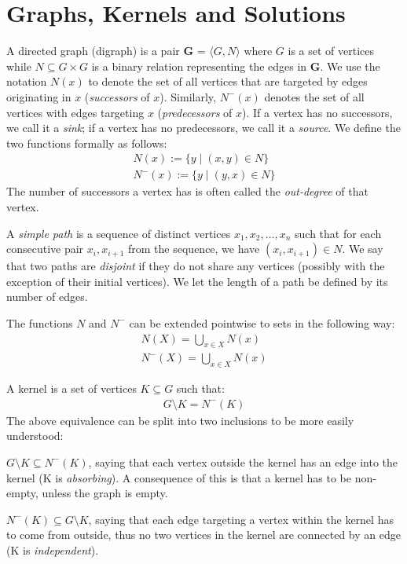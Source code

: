 \section{Graphs, Kernels and Solutions}
\label{sec:Graphs, Kernels and Solutions}
A directed graph (digraph) is a pair \textbf{G} = $\langle G,N \rangle$ where $G$ is a set of vertices while $N \subseteq G \times G$ is a binary relation representing the edges in \textbf{G}.
We use the notation $N(x)$ to denote the set of all vertices that are targeted by edges originating in $x$ (\textit{successors} of $x$).
Similarly, $N^-(x)$ denotes the set of all vertices with edges targeting $x$ (\textit{predecessors} of $x$).
If a vertex has no successors, we call it a \textit{sink}; if a vertex has no predecessors, we call it a \textit{source}.
We define the two functions formally as follows:
\begin{align}
  N(x) := \{y \;|\; (x,y) \in N\}\\
  N^-(x) := \{ y \;|\; (y,x) \in N \}
\end{align}
The number of successors a vertex has is often called the \textit{out-degree} of that vertex.

A \textit{simple path} is a sequence of distinct vertices $x_1,x_2,\dots,x_n$ such that for each consecutive pair $x_i,x_{i+1}$ from the sequence, we have $(x_i, x_{i+1}) \in N$.
We say that two paths are \textit{disjoint} if they do not share any vertices (possibly with the exception of their initial vertices).
We let the length of a path be defined by its number of edges.

The functions $N$ and $N^-$ can be extended pointwise to sets in the following way:
\begin{align}
  N(X) = \bigcup_{x \in X} N(x)\\
  N^-(X) = \bigcup_{x \in X} N(x)
\end{align}

A kernel is a set of vertices $K \subseteq G$ such that:
\begin{align}
  G \setminus K = N^-(K)
\end{align}
The above equivalence can be split into two inclusions to be more easily understood:

$G \setminus K \subseteq N^-(K)$, saying that each vertex outside the kernel has an edge into the kernel (K is \textit{absorbing}).
A consequence of this is that a kernel has to be non-empty, unless the graph is empty.

$N^-(K) \subseteq G \setminus K$, saying that each edge targeting a vertex within the kernel has to come from outside, thus no two vertices in the kernel are connected by an edge (K is \textit{independent}).

